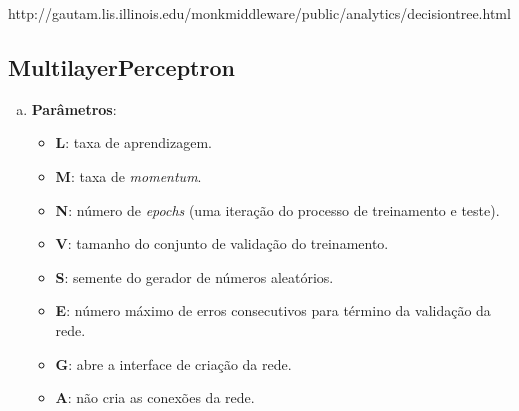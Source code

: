 http://gautam.lis.illinois.edu/monkmiddleware/public/analytics/decisiontree.html

\fi

\subsection{MultilayerPerceptron}

\begin{enumerate}[a)]
    \item \textbf{Parâmetros}:
        \begin{itemize}

            \item \textbf{L}: taxa de aprendizagem.

            \item \textbf{M}: taxa de \emph{momentum}.

            \item \textbf{N}: número de \emph{epochs} (uma iteração do processo de treinamento e teste).

            \item \textbf{V}: tamanho do conjunto de validação do treinamento.

            \item \textbf{S}: semente do gerador de números aleatórios.

            \item \textbf{E}: número máximo de erros consecutivos para término da validação da rede.

            \item \textbf{G}: abre a interface de criação da rede.

            \item \textbf{A}: não cria as conexões da rede.

\end{itemize}
\end{enumerate}
